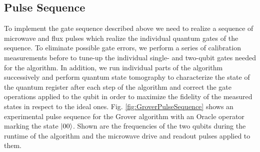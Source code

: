 \subsection{Pulse Sequence}

To implement the gate sequence described above we need to realize a sequence of microwave and flux pulses which realize the individual quantum gates of the sequence. To eliminate possible gate errors, we perform a series of calibration measurements before to tune-up the individual single- and two-qubit gates needed for the algorithm. In addition, we run individual parts of the algorithm successively and perform quantum state tomography to characterize the state of the quantum register after each step of the algorithm and correct the gate operations applied to the qubit in order to maximize the fidelity of the measured states in respect to the ideal ones. Fig. \ref{fig:GroverPulseSequence} shows an experimental pulse sequence for the Grover algorithm with an Oracle operator marking the state $\left| 00 \right>$. Shown are the frequencies of the two qubits during the runtime of the algorithm and the microwave drive and readout pulses applied to them.

